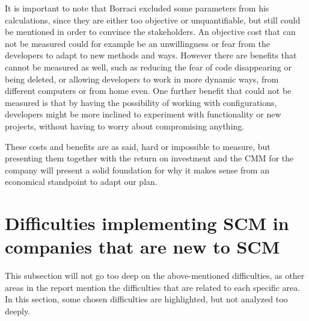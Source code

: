 \documentclass[10pt]{article}
\begin{document}
\noindent It is important to note that Borraci excluded some parameters from his calculations, since they are either too objective or unquantifiable, but still could be mentioned in order to convince the stakeholders. An objective cost that can not be measured could for example be an unwillingness or fear from the developers to adapt to new methods and ways. However there are benefits that cannot be measured as well, such as reducing the fear of code disappearing or being deleted, or allowing developers to work in more dynamic ways, from different computers or from home even. One further benefit that could not be measured is that by having the possibility of working with configurations, developers might be more inclined to experiment with functionality or new projects, without having to worry about compromising anything. 

\noindent These costs and benefits are as said, hard or impossible to measure, but presenting them together with the return on investment and the CMM for the company will present a solid foundation for why it makes sense from an economical standpoint to adapt our plan.

\section{Difficulties implementing SCM in companies that are new to SCM}
This subsection will not go too deep on the above-mentioned difficulties, as other areas in the report mention the difficulties that are related to each specific area. In this section, some chosen difficulties are highlighted, but not analyzed too deeply.
\end{document}
